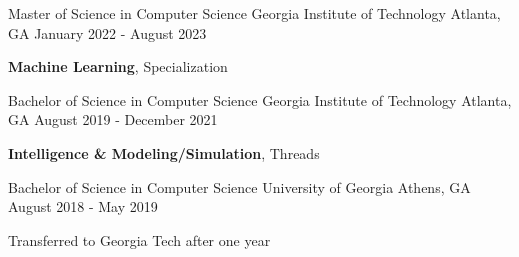 
\begin{cventries}
    \cventry
    {Master of Science in Computer Science} %
    {Georgia Institute of Technology} %
    {Atlanta, GA} %
    {January 2022 - August 2023} %
    {
      \begin{cvitems} %
         \item {\textbf{Machine Learning}, Specialization}
      \end{cvitems}
    }
    \cventry
        {Bachelor of Science in Computer Science} %
        {Georgia Institute of Technology} %
        {Atlanta, GA} %
        {August 2019 - December 2021} %
        {
          \begin{cvitems} %
             \item {\textbf{Intelligence \& Modeling/Simulation}, Threads}
          \end{cvitems}
        }
    \cventry
        {Bachelor of Science in Computer Science} %
        {University of Georgia} %
        {Athens, GA} %
        {August 2018 - May 2019} %
        {
          \begin{cvitems} %
             \item {Transferred to Georgia Tech after one year}
          \end{cvitems}
        }
\end{cventries}
